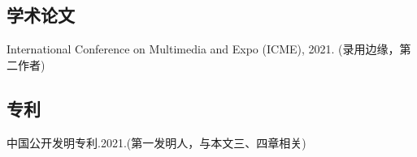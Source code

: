 
\begin{resume}

   \subsection*{学术论文}

   \begin{achievements}
   	\item International Conference on Multimedia and Expo (ICME), 2021. (录用边缘，第二作者)
   	
   \end{achievements}


  \subsection*{专利}

  \begin{achievements}
  	\item 中国公开发明专利.2021.(第一发明人，与本文三、四章相关)
    
    
  \end{achievements}

\end{resume}
